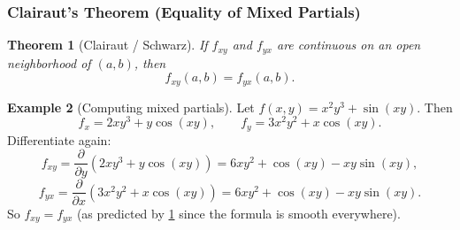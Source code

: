 \documentclass[12pt]{article}
\numberwithin{equation}{section}
\theoremstyle{plain}
\newtheorem{theorem}{Theorem}[section]
\theoremstyle{definition}
\newtheorem{example}[theorem]{Example}
\theoremstyle{remark}
\begin{document}
\subsubsection{Clairaut's Theorem (Equality of Mixed Partials)}

\begin{theorem}[Clairaut / Schwarz]\label{thm:clairaut}
If $f_{xy}$ and $f_{yx}$ are continuous on an open neighborhood of $(a,b)$, then
\[
f_{xy}(a,b)=f_{yx}(a,b).
\]
\end{theorem}

\begin{example}[Computing mixed partials]
Let $f(x,y)=x^2y^3+\sin(xy)$. Then
\[
f_x=2xy^3+y\cos(xy),\qquad
f_y=3x^2y^2+x\cos(xy).
\]
Differentiate again:
\[
f_{xy}=\frac{\partial}{\partial y}\left(2xy^3+y\cos(xy)\right)
=6xy^2+\cos(xy)-xy\sin(xy),
\]
\[
f_{yx}=\frac{\partial}{\partial x}\left(3x^2y^2+x\cos(xy)\right)
=6xy^2+\cos(xy)-xy\sin(xy).
\]
So $f_{xy}=f_{yx}$ (as predicted by \cref{thm:clairaut} since the formula is smooth everywhere).
\end{example}
\end{document}
